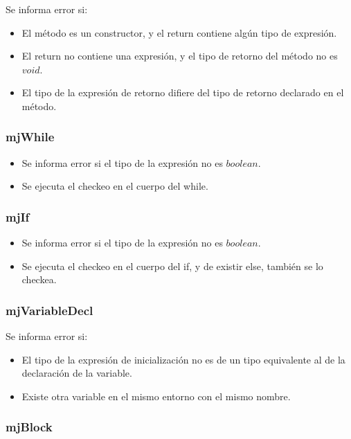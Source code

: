 \documentclass [a4paper,abstracton,titlepage]{scrartcl}
\begin{document}
  Se informa error si:

  \begin{itemize}
   \item El método es un constructor, y el return contiene algún tipo de
expresión.
   \item El return no contiene una expresión, y el tipo de retorno del
método no es $void$.
   \item El tipo de la expresión de retorno difiere del tipo de retorno
declarado en el método.
  \end{itemize}

  \subsubsection{mjWhile}

  \begin{itemize}
   \item Se informa error si el tipo de la expresión no es $boolean$.
   \item Se ejecuta el checkeo en el cuerpo del while.
  \end{itemize}

  \subsubsection{mjIf}

  \begin{itemize}
   \item Se informa error si el tipo de la expresión no es $boolean$.
   \item Se ejecuta el checkeo en el cuerpo del if, y de existir else, también
se lo checkea.
  \end{itemize}

  \subsubsection{mjVariableDecl}

  Se informa error si:

  \begin{itemize}
   \item El tipo de la expresión de inicialización no es de un tipo equivalente
al de la declaración de la variable.
   \item Existe otra variable en el mismo entorno con el mismo nombre.
  \end{itemize}

  \subsubsection{mjBlock}
\end{document}
